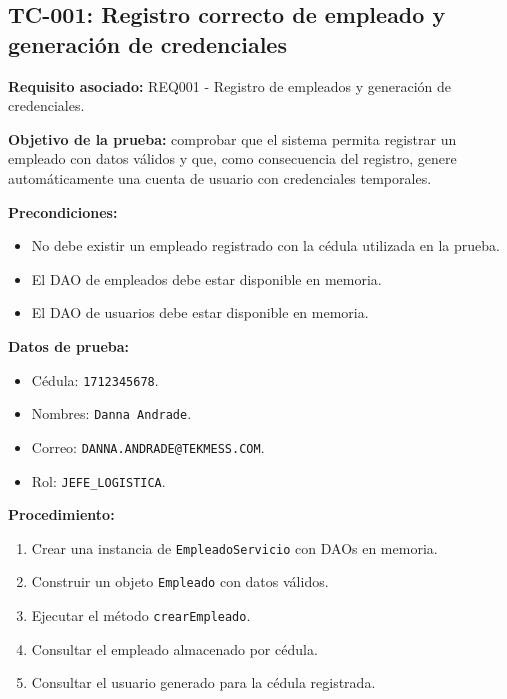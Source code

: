 \documentclass[12pt,a4paper]{article}
\begin{document}
\subsection{TC-001: Registro correcto de empleado y generación de credenciales}

\textbf{Requisito asociado:} REQ001 - Registro de empleados y generación de credenciales.

\textbf{Objetivo de la prueba:} comprobar que el sistema permita registrar un empleado con datos válidos y que, como consecuencia del registro, genere automáticamente una cuenta de usuario con credenciales temporales.

\textbf{Precondiciones:}
\begin{itemize}[leftmargin=*]
    \item No debe existir un empleado registrado con la cédula utilizada en la prueba.
    \item El DAO de empleados debe estar disponible en memoria.
    \item El DAO de usuarios debe estar disponible en memoria.
\end{itemize}

\textbf{Datos de prueba:}
\begin{itemize}[leftmargin=*]
    \item Cédula: \texttt{1712345678}.
    \item Nombres: \texttt{Danna Andrade}.
    \item Correo: \texttt{DANNA.ANDRADE@TEKMESS.COM}.
    \item Rol: \texttt{JEFE\_LOGISTICA}.
\end{itemize}

\textbf{Procedimiento:}
\begin{enumerate}[leftmargin=*]
    \item Crear una instancia de \texttt{EmpleadoServicio} con DAOs en memoria.
    \item Construir un objeto \texttt{Empleado} con datos válidos.
    \item Ejecutar el método \texttt{crearEmpleado}.
    \item Consultar el empleado almacenado por cédula.
    \item Consultar el usuario generado para la cédula registrada.
\end{enumerate}
\end{document}
